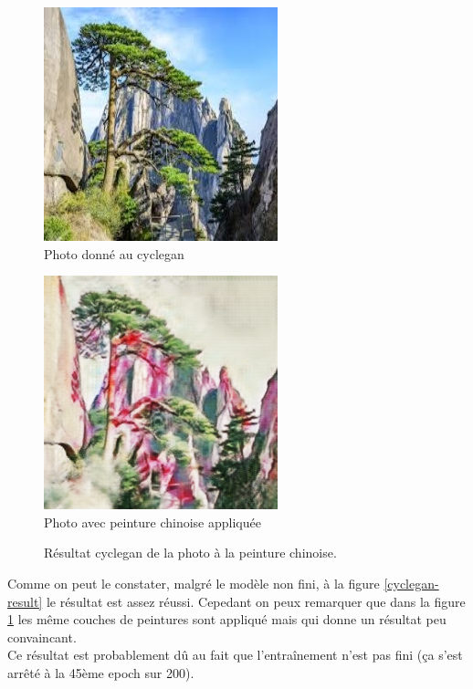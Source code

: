 \documentclass[a4paper, 12pt]{report}
\begin{document}
\begin{figure}[!h]
\centering 
\begin{minipage}{0.45\textwidth}
\centering
\includegraphics[scale=0.5]{images/cyclegan_real_A-2.png}
\\Photo donné au cyclegan
\\
\end{minipage}
\begin{minipage}{0.45\textwidth}
\centering
\includegraphics[scale=0.5]{images/cyclegan_fake_B-2.png}
\\Photo avec peinture chinoise appliquée
\end{minipage}
\caption{\centering Résultat cyclegan de la photo à la peinture chinoise.}
\label{cyclegan-result-fail}
\end{figure}


Comme on peut le constater, malgré le modèle non fini, à la figure \ref{cyclegan-result} le résultat est assez réussi. Cepedant on peux remarquer que dans la figure \ref{cyclegan-result-fail} les même couches de peintures sont appliqué mais qui donne un résultat peu convaincant. \\
Ce résultat est probablement dû au fait que l'entraînement n'est pas fini (ça s'est arrêté à la 45ème epoch sur 200).
\end{document}
